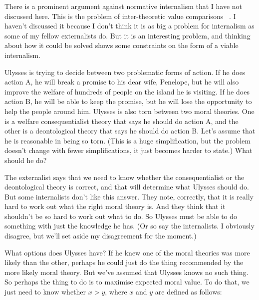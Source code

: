 There is a prominent argument against normative internalism that I have not discussed here. This is the problem of inter-theoretic value comparisons ~\citep{Sepielli2009, Hedden2015}. I haven't discussed it because I don't think it is as big a problem for internalism as some of my fellow externalists do. But it is an interesting problem, and thinking about how it could be solved shows some constraints on the form of a viable internalism.

\gls{Ulysses} is trying to decide between two problematic forms of action. If he does action A, he will break a promise to his dear wife, \gls{Penelope}, but he will also improve the welfare of hundreds of people on the island he is visiting. If he does action B, he will be able to keep the promise, but he will lose the opportunity to help the people around him. \gls{Ulysses} is also torn between two moral theories. One is a welfare consequentialist theory that says he should do action A, and the other is a deontological theory that says he should do action B. Let's assume that he is reasonable in being so torn. (This is a huge simplification, but the problem doesn't change with fewer simplifications, it just becomes harder to state.) What should he do?

The externalist says that we need to know whether the consequentialist or the deontological theory is correct, and that will determine what \gls{Ulysses} should do. But some internalists don't like this answer. They note, correctly, that it is really hard to work out what the right moral theory is. And they think that it shouldn't be so hard to work out what to do. So \gls{Ulysses} must be able to do something with just the knowledge he has. (Or so say the internalists. I obviously disagree, but we'll set aside my disagreement for the moment.)

What options does \gls{Ulysses} have? If he knew one of the moral theories was more likely than the other, perhaps he could just do the thing recommended by the more likely moral theory. But we've assumed that \gls{Ulysses} knows no such thing. So perhaps the thing to do is to maximise expected moral value. To do that, we just need to know whether $x > y$, where $x$ and $y$ are defined as follows:


